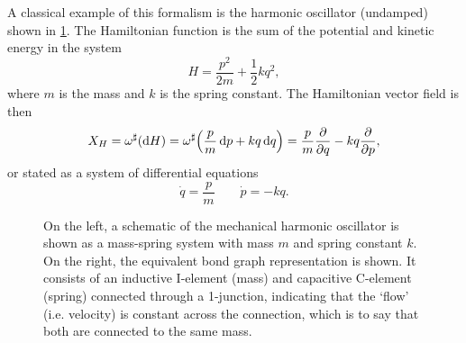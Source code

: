 A classical example of this formalism is the harmonic oscillator (undamped) shown in \cref{fig:ho}. The Hamiltonian function is the sum of the potential and kinetic energy in the system
\begin{equation}
     H = \frac{p^2}{2m} + \frac{1}{2}kq^2,
\end{equation}
where \(m\) is the mass and \(k\) is the spring constant. The Hamiltonian vector field is then 
\begin{equation}
     X_H = \omega^\sharp\qty(\dd{H}) = \omega^\sharp\qty(\frac{p}{m}\dd{p} + kq\dd{q}) = \frac{p}{m}\pdv{}{q} - kq \pdv{}{p},
\end{equation}
or stated as a system of differential equations
\begin{equation}
     \dot{q} = \frac{p}{m} \qquad \dot{p} = -kq.
\end{equation}
\begin{figure}[ht]
    \centering
    
    \caption{On the left, a schematic of the mechanical harmonic oscillator is shown as a mass-spring system with mass \(m\) and spring constant \(k\). On the right, the equivalent bond graph representation is shown. It consists of an inductive I-element (mass) and capacitive C-element (spring) connected through a 1-junction, indicating that the `flow' (i.e. velocity) is constant across the connection, which is to say that both are connected to the same mass.}
    \label{fig:ho}
\end{figure}

